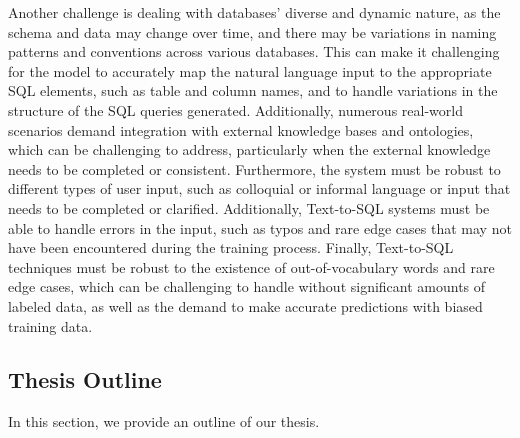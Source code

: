 Another challenge is dealing with databases' diverse and dynamic nature, as the schema and data may change over time, and there may be variations in naming patterns and conventions across various databases. This can make it challenging for the model to accurately map the natural language input to the appropriate SQL elements, such as table and column names, and to handle variations in the structure of the SQL queries generated. Additionally, numerous real-world scenarios demand integration with external knowledge bases and ontologies, which can be challenging to address, particularly when the external knowledge needs to be completed or consistent. Furthermore, the system must be robust to different types of user input, such as colloquial or informal language or input that needs to be completed or clarified. Additionally, Text-to-SQL systems must be able to handle errors in the input, such as typos and rare edge cases that may not have been encountered during the training process. Finally, Text-to-SQL techniques must be robust to the existence of out-of-vocabulary words and rare edge cases, which can be challenging to handle without significant amounts of labeled data, as well as the demand to make accurate predictions with biased training data.

\clearpage
\subsection{Thesis Outline}

In this section, we provide an outline of our thesis.

